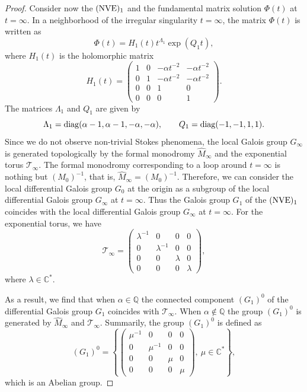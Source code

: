 \documentclass[10pt,a4paper]{amsart}
\numberwithin{equation}{section}
\begin{document}
\begin{proof}
 Consider now the $({\rm NVE})_1$ and the fundamental matrix solution $\Phi(t)$ at $t=\infty$. In a neighborhood of the irregular singularity $t=\infty$, the matrix $\Phi(t)$ is written
 as
 \[
 \Phi(t)=H_1(t) t^{\Lambda_1} \exp (Q_1 t) ,
 \]
 where $H_1(t)$ is the holomorphic matrix
 \[
 H_1(t)=\begin{pmatrix}
 1 & 0 & -\alpha t^{-2} & -\alpha t^{-2}\\
 0 & 1 & -\alpha t^{-2} & -\alpha t^{-2}\\
 0 & 0 & 1 & 0\\
 0 & 0 & 0 & 1
 \end{pmatrix} .
 \]
 The matrices $\Lambda_1$ and $Q_1$ are given by
 \[
 \Lambda_1={\rm diag} (\alpha-1, \alpha-1, -\alpha, -\alpha),\qquad
 Q_1={\rm diag}(-1, -1, 1, 1) .
 \]
 Since we do not observe non-trivial Stokes phenomena, the local Galois group $G_{\infty}$ is generated topologically by the formal monodromy $\hat{M}_{\infty}$ and the
 exponential torus $\mathcal{T}_{\infty}$. The formal monodromy corresponding to a loop around $t=\infty$ is nothing but $(M_0)^{-1}$, that is, $\hat{M}_{\infty}=(M_0)^{-1}$. Therefore, we can consider
 the local differential Galois group $G_0$ at the origin as a subgroup of the local differential Galois group $G_{\infty}$ at $t=\infty$. Thus the Galois group $G_1$ of the $({\rm NVE})_1$
 coincides with the local differential Galois group $G_{\infty}$ at $t=\infty$. For the exponential torus, we have
 \[
 \mathcal{T}_{\infty}=\begin{pmatrix}
 \lambda^{-1} & 0 & 0 & 0\\
 0 & \lambda^{-1} & 0 & 0\\
 0 & 0 & \lambda & 0\\
 0 & 0 & 0 & \lambda
 \end{pmatrix} ,
 \]
 where $\lambda\in\mathbb{C}^*$.

 As a result, we find that when $\alpha\in\mathbb{Q}$ the connected component $(G_1)^0$ of the differential Galois group $G_1$ coincides with $\mathcal{T}_{\infty}$. When $\alpha\notin\mathbb{Q}$ the group
 $(G_1)^0$ is generated by $\hat{M}_{\infty}$ and $\mathcal{T}_{\infty}$. Summarily, the group $(G_1)^0$ is defined as
 \[
 (G_1)^0=\left\{\begin{pmatrix}
 \mu^{-1} & 0 & 0 & 0\\
 0 & \mu^{-1} & 0 & 0\\
 0 & 0 & \mu & 0\\
 0 & 0 & 0 & \mu
 \end{pmatrix}, \ \mu\in\mathbb{C}^*\right\} ,
 \]
 which is an Abelian group.
 \end{proof}
\end{document}
